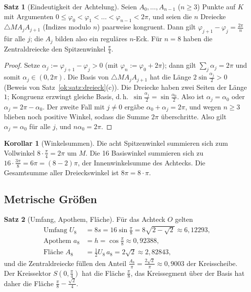 \documentclass[a4paper,12pt,twoside]{report}
\theoremstyle{definition}
\newtheorem{satz}{Satz}
\newtheorem{korollar}{Korollar}
\begin{document}
\begin{satz}[Eindeutigkeit der Achtelung]\label{ok:satz:eindeutig}
Seien $A_0,\dots,A_{n-1}$ ($n\ge3$) Punkte auf $K$ mit Argumenten $0\le\varphi_0<\varphi_1<\dots<\varphi_{n-1}<2\pi$, und seien die $n$ Dreiecke $\triangle MA_jA_{j+1}$ (Indizes modulo $n$) paarweise kongruent. Dann gilt $\varphi_{j+1}-\varphi_j=\frac{2\pi}n$ für alle $j$; die $A_j$ bilden also ein reguläres $n$-Eck. Für $n=8$ haben die Zentraldreiecke den Spitzenwinkel $\frac\pi4$.
\end{satz}

\begin{proof}
Setze $\alpha_j:=\varphi_{j+1}-\varphi_j>0$ (mit $\varphi_n:=\varphi_0+2\pi$); dann gilt $\sum_j\alpha_j=2\pi$ und somit $\alpha_j\in(0,2\pi)$. Die Basis von $\triangle MA_jA_{j+1}$ hat die Länge $2\sin\frac{\alpha_j}2>0$ (Beweis von Satz~\ref{ok:satz:dreieck}(c)). Die Dreiecke haben zwei Seiten der Länge $1$; Kongruenz erzwingt gleiche Basis, d.\,h.\ $\sin\frac{\alpha_j}2=\sin\frac{\alpha_0}2$. Also ist $\alpha_j=\alpha_0$ oder $\alpha_j=2\pi-\alpha_0$. Der zweite Fall mit $j\ne0$ ergäbe $\alpha_0+\alpha_j=2\pi$, und wegen $n\ge3$ blieben noch positive Winkel, sodass die Summe $2\pi$ überschritte. Also gilt $\alpha_j=\alpha_0$ für alle $j$, und $n\alpha_0=2\pi$.
\end{proof}

\begin{korollar}[Winkelsummen]\label{ok:kor:winkel}
Die acht Spitzenwinkel summieren sich zum Vollwinkel $8\cdot\frac\pi4=2\pi$ um $M$. Die 16 Basiswinkel summieren sich zu $16\cdot\frac{3\pi}8=6\pi=(8-2)\pi$, der Innenwinkelsumme des Achtecks. Die Gesamtsumme aller Dreieckswinkel ist $8\pi=8\cdot\pi$.
\end{korollar}

\subsection{Metrische Größen}
\label{sec:ok:metrik}

\begin{satz}[Umfang, Apothem, Fläche]\label{ok:satz:metrik}
Für das Achteck $O$ gelten
\begin{align*}
\text{Umfang }U_8&=8s=16\sin\tfrac\pi8=8\sqrt{2-\sqrt2}\approx6{,}12293,\\
\text{Apothem }a_8&=h=\cos\tfrac\pi8\approx0{,}92388,\\
\text{Fläche }A_8&=\tfrac12U_8\,a_8=2\sqrt2\approx2{,}82843,
\end{align*}
und die Zentraldreiecke füllen den Anteil $\frac{A_8}{\pi}=\frac{2\sqrt2}\pi\approx0{,}9003$ der Kreisscheibe. Der Kreissektor $S(0,\frac\pi4)$ hat die Fläche $\frac\pi8$, das Kreissegment über der Basis hat daher die Fläche $\frac\pi8-\frac{\sqrt2}4$.
\end{satz}
\end{document}
